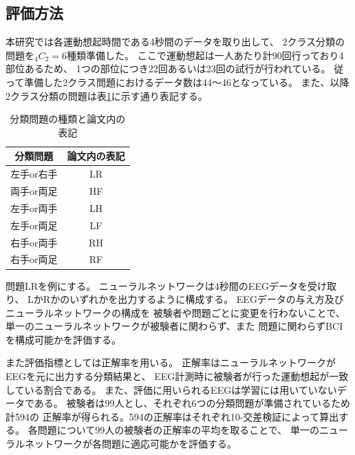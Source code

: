 \subsection{\mc 評価方法}
本研究では各運動想起時間である4秒間のデータを取り出して、
2クラス分類の問題を\(_4C_2=6\)種類準備した。
ここで運動想起は一人あたり計90回行っており4部位あるため、
1つの部位につき22回あるいは23回の試行が行われている。
従って準備した2クラス問題におけるデータ数は44〜46となっている。
また、以降2クラス分類の問題は表\ref{table:pattern}に示す通り表記する。
\begin{table}[t]
    \centering
    \caption{分類問題の種類と論文内の表記}
    \begin{tabular}{|c|c|} \hline
        分類問題 & 論文内の表記 \\ \hline
        左手or右手 & LR \\ \hline
        両手or両足 & HF \\ \hline
        左手or両手 & LH \\ \hline
        左手or両足 & LF \\ \hline
        右手or両手 & RH \\ \hline
        右手or両足 & RF \\ \hline
    \end{tabular}
    \label{table:pattern}
\end{table}
問題LRを例にする。
ニューラルネットワークは4秒間のEEGデータを受け取り、
LかRかのいずれかを出力するように構成する。
EEGデータの与え方及びニューラルネットワークの構成を
被験者や問題ごとに変更を行わないことで、
単一のニューラルネットワークが被験者に関わらず、また
問題に関わらずBCIを構成可能かを評価する。

また評価指標としては正解率を用いる。
正解率はニューラルネットワークがEEGを元に出力する分類結果と、
EEG計測時に被験者が行った運動想起が一致している割合である。
また、評価に用いられるEEGは学習には用いていないデータである。
被験者は99人とし、それぞれ6つの分類問題が準備されているため計594の
正解率が得られる。594の正解率はそれぞれ10-交差検証によって算出する。
各問題について99人の被験者の正解率の平均を取ることで、
単一のニューラルネットワークが各問題に適応可能かを評価する。

